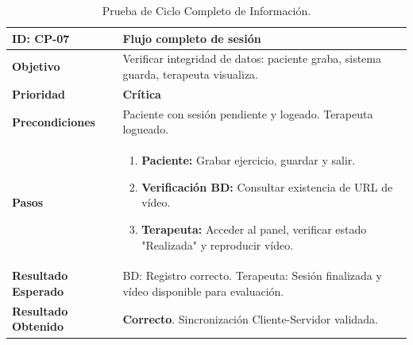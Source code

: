 \begin{table}[H]
    \centering
    \begin{tabularx}{\textwidth}{|l|X|}
        \hline
        \rowcolor{gray!25} \textbf{ID: CP-07} & \textbf{Flujo completo de sesión} \\ \hline
        \textbf{Objetivo} & Verificar integridad de datos: paciente graba, sistema guarda, terapeuta visualiza. \\ \hline
        \textbf{Prioridad} & \textbf{Crítica} \\ \hline
        \textbf{Precondiciones} & Paciente con sesión pendiente y logeado. Terapeuta logueado. \\ \hline
        \textbf{Pasos} & 
        \vspace*{-\baselineskip}
        \begin{enumerate}
            \item \textbf{Paciente:} Grabar ejercicio, guardar y salir.
            \item \textbf{Verificación BD:} Consultar existencia de URL de vídeo.
            \item \textbf{Terapeuta:} Acceder al panel, verificar estado "Realizada" y reproducir vídeo.
        \end{enumerate} \\ \hline
        \textbf{Resultado Esperado} & BD: Registro correcto. Terapeuta: Sesión finalizada y vídeo disponible para evaluación. \\ \hline
        \textbf{Resultado Obtenido} & \textcolor{green!40!black}{\textbf{Correcto}}. Sincronización Cliente-Servidor validada. \\ \hline
    \end{tabularx}
    \caption{Prueba de Ciclo Completo de Información.}
\end{table}

